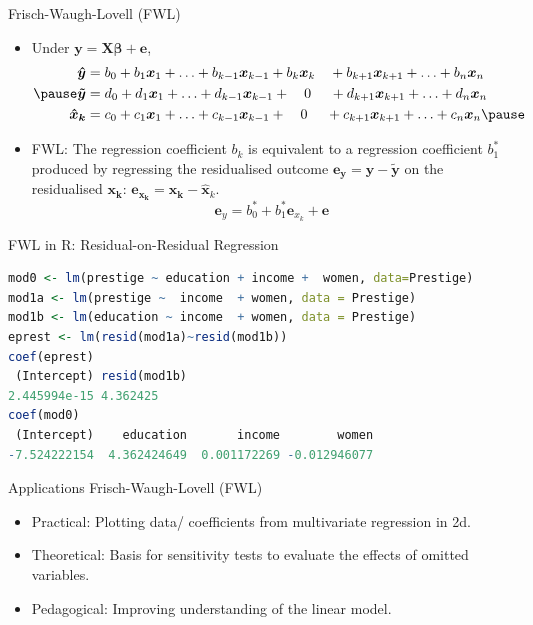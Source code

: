 \documentclass[aspectratio=169, handout, t]{beamer}
\numberwithin{equation}{section}
\begin{document}
\begin{frame}{Frisch-Waugh-Lovell (FWL)}
\begin{itemize}
\item Under $\bm{y} = \bm{X\beta}+\bm{e}$,
\begin{align*}
\bm{\hat{y}} &=b_0+ b_1\bm{x}_1+\ldots + b_{k-1} \bm{x}_{k-1} + b_{k} \bm{x}_{k}\quad + b_{k+1} \bm{x}_{k+1}+  \ldots+b_{n} \bm{x}_{n}\\\pause
\bm{\tilde{y}} &= d_0+ d_1\bm{x}_1+\ldots + d_{k-1} \bm{x}_{k-1} + \quad0\quad \ + d_{k+1} \bm{x}_{k+1}+  \ldots+d_{n} \bm{x}_{n}\\
\bm{\hat{x}_k} &= c_0+ c_1\bm{x}_1+\ldots + c_{k-1} \bm{x}_{k-1}+ \quad0\quad \ +  c_{k+1} \bm{x}_{k+1}+ \ldots+c_{n} \bm{x}_{n}\pause
\end{align*}
\item FWL: The regression coefficient $b_k$ is equivalent to a regression coefficient $b^{*}_1$ produced by regressing the residualised outcome $\bm{e_y}=\bm{y}-\bm{\tilde{y}}$ on the residualised $\bm{x_k}$: $\bm{e_{x_k}}=\bm{x_k}-\bm{\hat{x}}_k$.
$$\bm{e}_y= b^*_0+ b^*_1\bm{e}_{x_k}+\bm{e}$$
\end{itemize}
\end{frame}




\begin{frame}[fragile]{FWL in R: Residual-on-Residual Regression}
  \begin{lstlisting}[language=R]
mod0 <- lm(prestige ~ education + income +  women, data=Prestige)
mod1a <- lm(prestige ~  income  + women, data = Prestige)
mod1b <- lm(education ~ income  + women, data = Prestige)
eprest <- lm(resid(mod1a)~resid(mod1b))
coef(eprest)
 (Intercept) resid(mod1b) 
2.445994e-15 4.362425
coef(mod0)
 (Intercept)    education       income        women 
-7.524222154  4.362424649  0.001172269 -0.012946077 
\end{lstlisting} 
\end{frame}

\begin{frame}{Applications Frisch-Waugh-Lovell (FWL)}
\begin{itemize}
\item Practical: Plotting data/ coefficients from multivariate regression in 2d.
\item Theoretical: Basis for sensitivity tests to evaluate the effects of omitted variables.
\item Pedagogical: Improving understanding of the linear model.
\end{itemize}
\end{frame}
\end{document}
